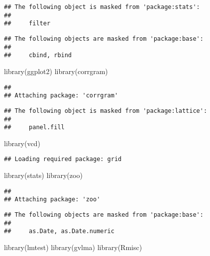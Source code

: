 \documentclass[
]{article}
\newenvironment{Shaded}{\begin{snugshade}}{\end{snugshade}}
\newcommand{\FunctionTok}[1]{\textcolor[rgb]{0.00,0.00,0.00}{#1}}
\newcommand{\NormalTok}[1]{#1}
\begin{document}
\begin{verbatim}
## The following object is masked from 'package:stats':
## 
##     filter
\end{verbatim}

\begin{verbatim}
## The following objects are masked from 'package:base':
## 
##     cbind, rbind
\end{verbatim}

\begin{Shaded}
\begin{Highlighting}[]
\FunctionTok{library}\NormalTok{(ggplot2)}
\FunctionTok{library}\NormalTok{(corrgram)}
\end{Highlighting}
\end{Shaded}

\begin{verbatim}
## 
## Attaching package: 'corrgram'
\end{verbatim}

\begin{verbatim}
## The following object is masked from 'package:lattice':
## 
##     panel.fill
\end{verbatim}

\begin{Shaded}
\begin{Highlighting}[]
\FunctionTok{library}\NormalTok{(vcd)}
\end{Highlighting}
\end{Shaded}

\begin{verbatim}
## Loading required package: grid
\end{verbatim}

\begin{Shaded}
\begin{Highlighting}[]
\FunctionTok{library}\NormalTok{(stats) }
\FunctionTok{library}\NormalTok{(zoo)}
\end{Highlighting}
\end{Shaded}

\begin{verbatim}
## 
## Attaching package: 'zoo'
\end{verbatim}

\begin{verbatim}
## The following objects are masked from 'package:base':
## 
##     as.Date, as.Date.numeric
\end{verbatim}

\begin{Shaded}
\begin{Highlighting}[]
\FunctionTok{library}\NormalTok{(lmtest)}
\FunctionTok{library}\NormalTok{(gvlma) }
\FunctionTok{library}\NormalTok{(Rmisc)}
\end{Highlighting}
\end{Shaded}
\end{document}

